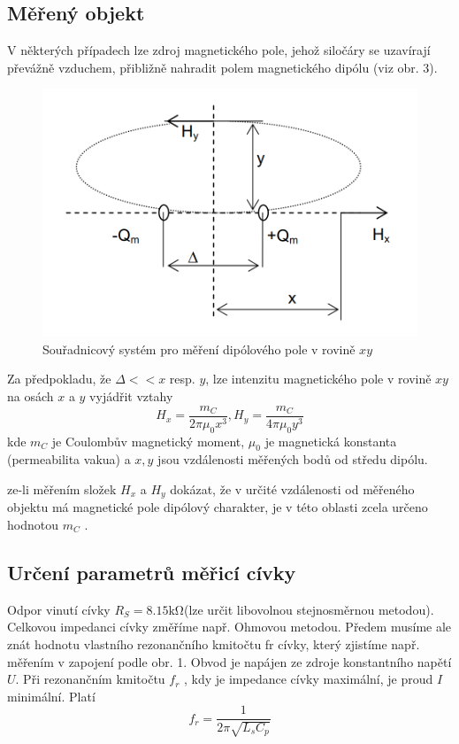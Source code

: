 \documentclass{article}
\begin{document}
\subsection{Měřený objekt}
V některých případech lze zdroj magnetického pole, jehož siločáry se uzavírají převážně vzduchem, přibližně nahradit polem magnetického dipólu (viz obr. 3).
\begin{figure}[H]
	\centering
	\includegraphics[width=0.6\linewidth]{screenshot002}
	\caption{Souřadnicový systém pro měření dipólového pole v rovině $xy$}
	\label{fig:screenshot002}
\end{figure}

Za předpokladu, že $\Delta<<x$ resp. $y$, lze intenzitu magnetického pole v rovině $xy$ na osách $x$ a $y $ vyjádřit vztahy
\begin{equation}
	H_x = \frac{m_C}{2\pi\mu_0x^3}, H_y = \frac{m_C}{4\pi\mu_0y^3}
\end{equation}
kde $m_C$ je Coulombův magnetický moment, $\mu_0$ je magnetická konstanta (permeabilita vakua) a $x,y$ jsou vzdálenosti měřených bodů od středu dipólu.

ze-li měřením složek $H_x$ a $H_y$ dokázat, že v určité vzdálenosti od měřeného objektu má magnetické pole dipólový charakter, je v této oblasti zcela určeno hodnotou $m_C$ .

\subsection{Určení parametrů měřicí cívky}
Odpor vinutí cívky $R_S = 8.15\si{\kilo\ohm}$(lze určit libovolnou stejnosměrnou metodou). Celkovou 
impedanci cívky změříme např. Ohmovou metodou. Předem musíme ale znát hodnotu vlastního rezonančního kmitočtu  fr  cívky, který zjistíme např. měřením v zapojení podle 
obr. 1. Obvod  je  napájen  ze  zdroje  konstantního  napětí  $U$.  Při  rezonančním  kmitočtu    $f_r$  ,  kdy  je  impedance cívky maximální, je proud  $I$  minimální. Platí
\begin{equation}
	f_r = \frac{1}{2\pi\sqrt{L_sC_p}}
\end{equation}
\end{document}
